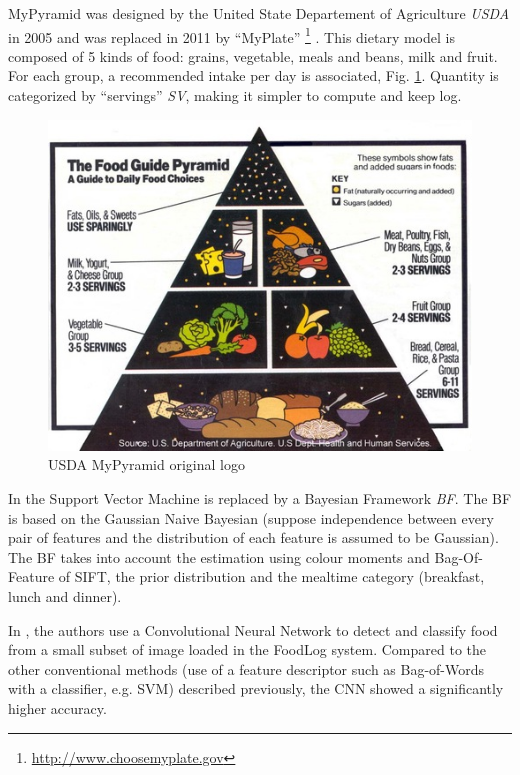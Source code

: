 MyPyramid \cite{MyPyramid} was designed by the United State Departement of Agriculture \textit{USDA} in 2005 and was replaced in 2011 by \enquote{MyPlate} \footnote{\url{http://www.choosemyplate.gov}} \cite{MyPlate}. This dietary model is composed of 5 kinds of food: grains, vegetable, meals and beans, milk and fruit. For each group, a recommended intake per day is associated, Fig. \ref{fig:my_pyramid}. Quantity is categorized by \enquote{servings} \textit{SV}, making it simpler to compute and keep log.

\begin{figure}
    \centering
    \includegraphics[scale=0.8]{img/my_pyramid.jpg}
    \caption{USDA MyPyramid original logo}
    \label{fig:my_pyramid}
\end{figure}

In \cite{Aizawa2013} the Support Vector Machine is replaced by a Bayesian Framework \textit{BF}.
The BF is based on the Gaussian Naive Bayesian (suppose independence between every pair of features and the distribution of each feature is assumed to be Gaussian). The BF takes into account the estimation using colour moments and Bag-Of-Feature of SIFT, the prior distribution and the mealtime category (breakfast, lunch and dinner).

In \cite{Kagaya2014}, the authors use a Convolutional Neural Network  to detect and classify food from a small subset of image loaded in the FoodLog system. Compared to the other conventional methods (use of a feature descriptor such as Bag-of-Words with a classifier, e.g. SVM) described previously, the CNN showed a significantly higher accuracy.

